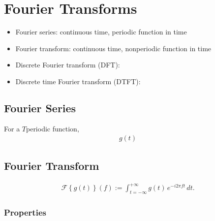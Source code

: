 \documentclass[letterpaper,10pt,english]{jupyterBook}
\begin{document}
\sphinxstepscope


\chapter{Fourier Transforms}
\label{\detokenize{ch/complex/fourier:fourier-transforms}}\label{\detokenize{ch/complex/fourier:complex-fourier}}\label{\detokenize{ch/complex/fourier::doc}}\begin{itemize}
\item {} 
\sphinxAtStartPar
Fourier series: continuous time, periodic function in time

\item {} 
\sphinxAtStartPar
Fourier transform: continuous time, non\sphinxhyphen{}periodic function in time

\item {} 
\sphinxAtStartPar
Discrete Fourier transform (DFT):

\item {} 
\sphinxAtStartPar
Discrete time Fourier transform (DTFT):

\end{itemize}


\section{Fourier Series}
\label{\detokenize{ch/complex/fourier:fourier-series}}\label{\detokenize{ch/complex/fourier:complex-fourier-fs}}
\sphinxAtStartPar
For a \(T\)\sphinxhyphen{}periodic function,
\begin{equation*}
\begin{split}g(t) \end{split}
\end{equation*}

\section{Fourier Transform}
\label{\detokenize{ch/complex/fourier:fourier-transform}}\label{\detokenize{ch/complex/fourier:complex-fourier-ft}}\begin{equation*}
\begin{split}\mathscr{F}\left\{ g(t) \right\}(f) := \int_{t = -\infty}^{+\infty} g(t) \, e^{-i 2 \pi f t} \, dt .\end{split}
\end{equation*}

\subsection{Properties}
\label{\detokenize{ch/complex/fourier:properties}}
\sphinxAtStartPar
{}
\end{document}
